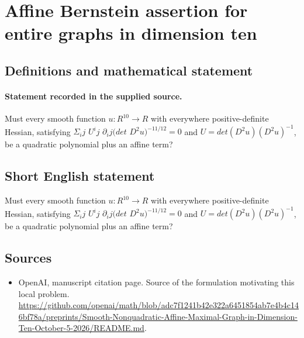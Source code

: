 \documentclass[11pt]{article}
\begin{document}
\section*{Affine Bernstein assertion for entire graphs in dimension ten}\label{30007131}
\subsection{Definitions and mathematical statement}
\paragraph{Statement recorded in the supplied source.}
Must every smooth function $u:R^{10}\to R$ with everywhere positive-definite Hessian, satisfying $\Sigma _ij$ $U^ij$ $\partial _ij(det$ $D^{2}u)^{-11/12}=0$ and $U=det(D^{2}u)(D^{2}u)^{-1}$, be a quadratic polynomial plus an affine term?
\subsection{Short English statement}
Must every smooth function $u:R^{10}\to R$ with everywhere positive-definite Hessian, satisfying $\Sigma _ij$ $U^ij$ $\partial _ij(det$ $D^{2}u)^{-11/12}=0$ and $U=det(D^{2}u)(D^{2}u)^{-1}$, be a quadratic polynomial plus an affine term?
\subsection{Sources}
\begin{itemize}
\item[S1] OpenAI, manuscript citation page. Source of the formulation motivating this local problem.
\url{https://github.com/openai/math/blob/adc7f1241b42e322a6451854ab7e4b4c146bf78a/preprints/Smooth-Nonquadratic-Affine-Maximal-Graph-in-Dimension-Ten-October-5-2026/README.md}.
\end{itemize}
\end{document}
